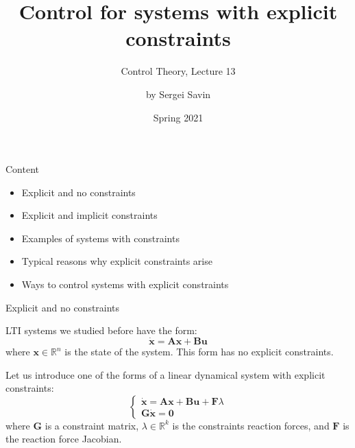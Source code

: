 \documentclass{beamer}
\title{Control for systems with explicit constraints}
\subtitle{Control Theory, Lecture 13}
\author{by Sergei Savin}
\date{Spring 2021}
\begin{document}
\maketitle


\begin{frame}{Content}

\begin{itemize}
\item Explicit and no constraints
\item Explicit and implicit constraints
\item Examples of systems with constraints
\item Typical reasons why explicit constraints arise
\item Ways to control systems with explicit constraints
\end{itemize}

\end{frame}


\begin{frame}{Explicit and no constraints}
\begin{flushleft}

LTI systems we studied before have the form:
%
\[
\dot {\mathbf x} = \mathbf A \mathbf x + 
\mathbf B \mathbf u
\]
%
where $\mathbf x \in \mathbb{R}^n$ is the state of the system. This form has no explicit constraints.

\bigskip

Let us introduce one of the forms of a linear dynamical system with explicit constraints:
%
\[
\begin{cases}
\dot {\mathbf x} = \mathbf A \mathbf x + 
\mathbf B \mathbf u + \mathbf F \lambda \\
\mathbf G \dot {\mathbf x} = \mathbf 0
\end{cases}
\]
%
where $\mathbf G$ is a constraint matrix, $\lambda \in \mathbb{R}^k$ is the constraints reaction forces, and $\mathbf F$ is the reaction force Jacobian.

\end{flushleft}
\end{frame}
\end{document}
